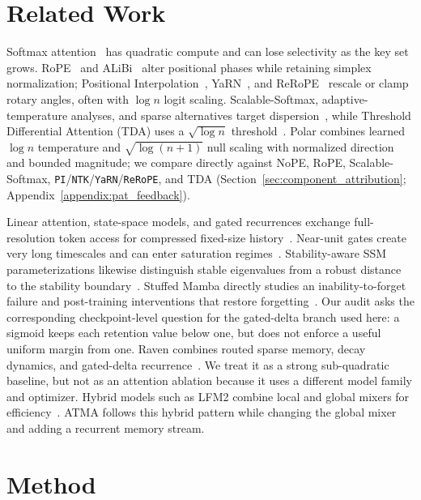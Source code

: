 \documentclass{article}
\newcommand{\rev}[1]{{\color{revcolor}#1}}
\begin{document}
\section{Related Work}

Softmax attention~\citep{Vaswani+2017} has quadratic compute and can lose selectivity as the key set grows. RoPE~\citep{rope2021} and ALiBi~\citep{alibi2021} alter positional phases while retaining simplex normalization; \rev{Positional Interpolation~\citep{chen2023extending}, YaRN~\citep{peng2024yarn}, and ReRoPE~\citep{su2023rerope} rescale or clamp rotary angles, often with $\log n$ logit scaling.} Scalable-Softmax, adaptive-temperature analyses, and sparse alternatives target dispersion~\citep{nakanishi2025scalable,velickovic2025softmax,vasylenko2026sparse}, while Threshold Differential Attention (TDA) uses a $\sqrt{\log n}$ threshold~\citep{huang2026threshold}. Polar combines learned $\log n$ temperature and $\sqrt{\log(n+1)}$ null scaling with normalized direction and bounded magnitude; \rev{we compare directly against NoPE, RoPE, Scalable-Softmax, \texttt{PI}/\texttt{NTK}/\texttt{YaRN}/\texttt{ReRoPE}, and TDA (Section~\ref{sec:component_attribution}; Appendix~\ref{appendix:pat_feedback}).}

Linear attention, state-space models, and gated recurrences exchange full-resolution token access for compressed fixed-size history~\citep{mamba2023,deltanet2024,yang2024gated,titans2025}. Near-unit gates create very long timescales and can enter saturation regimes~\citep{gu2020gating}. Stability-aware SSM parameterizations likewise distinguish stable eigenvalues from a robust distance to the stability boundary~\citep{wang2024stablessm}. Stuffed Mamba directly studies an inability-to-forget failure and post-training interventions that restore forgetting~\citep{chen2025stuffed}. Our audit asks the corresponding checkpoint-level question for the gated-delta branch used here: a sigmoid keeps each retention value below one, but does not enforce a useful uniform margin from one. Raven combines routed sparse memory, decay dynamics, and gated-delta recurrence~\citep{raven2026}. We treat it as a strong sub-quadratic baseline, but not as an attention ablation because it uses a different model family and optimizer. Hybrid models such as LFM2 combine local and global mixers for efficiency~\citep{lfm2_2025,physics_lms_2025}. ATMA follows this hybrid pattern while changing the global mixer and adding a recurrent memory stream.

\section{Method}
\end{document}
